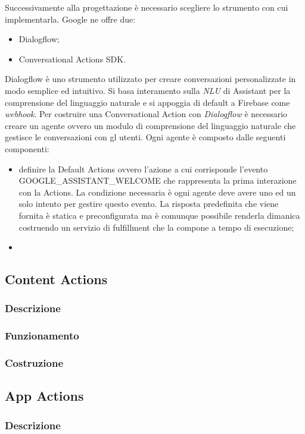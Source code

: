 		Successivamente alla progettazione è necessario scegliere lo strumento con cui implementarla. Google ne offre due:
		\begin{itemize}
			\item Dialogflow;
			\item Conversational Actions SDK.
		\end{itemize}
		Dialogflow è uno strumento utilizzato per creare conversazioni personalizzate in modo semplice ed intuitivo. Si basa interamento sulla \textit{NLU} di Assistant per la comprensione del linguaggio naturale e si appoggia di default a Firebase come \textit{webhook}. Per costruire una Conversational Action con \textit{Dialogflow} è necessario creare un agente ovvero un modulo di comprensione del linguaggio naturale che gestisce le conversazioni con gl utenti. Ogni agente è composto dalle seguenti componenti:
		\begin{itemize}
			\item definire la Default Actions ovvero l'azione a cui corrisponde l'evento GOOGLE\_ASSISTANT\_WELCOME che rappresenta la prima interazione con la Actions. La condizione necessaria è ogni agente deve avere uno ed un solo intento per gestire questo evento. La risposta predefinita che viene fornita è statica e preconfigurata ma è comunque possibile renderla dimanica costruendo un servizio di fulfillment che la compone a tempo di esecuzione;
			\item 
		\end{itemize}
	\subsection{Content Actions}
		\subsubsection{Descrizione}
		\subsubsection{Funzionamento}
		\subsubsection{Costruzione}
	\subsection{App Actions}
		\subsubsection{Descrizione}
